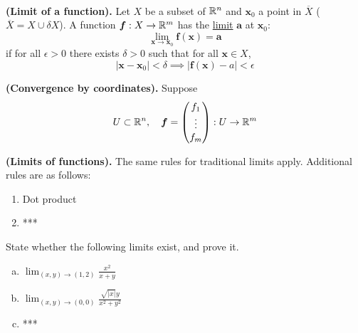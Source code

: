 \\

\begin{defn}
\textbf{(Limit of a function).} Let $X$ be a subset of $\mathbb{R}^n$ and $\bm{x}_0$ a point in $\overline{X}$ ($\overline{X}=X\cup \delta X$). A function $\bm{f} : X \rightarrow \mathbb{R}^m$ has the \ul{limit}
 $\bm{a}$ at $\bm{x}_0$:
\[\lim_{\bm{x}\rightarrow \bm{x}_0}\bm{f}(\bm{x}) = \bm{a}\]
if for all $\epsilon > 0$ there exists $\delta > 0$ such that for all $\bm{x}\in X$,
\[|\bm{x}-\bm{x}_0|<\delta \implies |\bm{f}(\bm{x})-a|<\epsilon\]
\end{defn}

\begin{proposition}
\textbf{(Convergence by coordinates).} Suppose
\[U\subset \mathbb{R}^n, \quad \bm{f}=\begin{pmatrix} f_1 \\ \vdots \\ f_m \end{pmatrix}: U\rightarrow \mathbb{R}^m\]
\end{proposition}

\begin{theorem}
  \textbf{(Limits of functions).} The same rules for traditional limits apply. Additional rules are as follows:
  \begin{enumerate}
    \item Dot product
    \item ***
  \end{enumerate}
\end{theorem}

 State whether the following limits exist, and prove it.
\begin{enumerate}[a.]
  \item $\displaystyle \lim_{(x,y)\rightarrow (1,2)} \frac{x^2}{x+y}$
  \item $\displaystyle \lim_{(x,y)\rightarrow (0,0)} \frac{\sqrt{|x|}y}{x^2+y^2}$
  \item ***

\end{enumerate}
